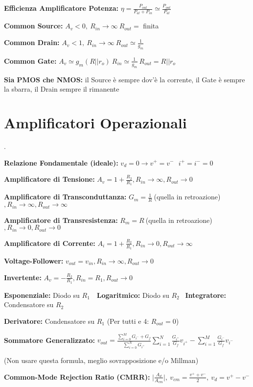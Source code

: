 \documentclass[12pt]{extarticle}
\begin{document}
{\bf Efficienza Amplificatore Potenza:} $\displaystyle \eta = \frac{P_{out}}{P_{al}+P_{in}} \simeq \frac{P_{out}}{P_{al}}$ 

{\bf Common Source:} $ A_v < 0, \ R_{in} \to \infty \ R_{out} = $ finita 

{\bf Common Drain:} $ A_v < 1, \ R_{in} \to \infty \ R_{out} \simeq \frac{1}{g_m}$	

{\bf Common Gate:} $ A_v \simeq g_m(R || r_o) \ R_{in} \simeq \frac{1}{g_m} \ R_{out} = R || r_o$ 

{\bf Sia PMOS che NMOS:} il Source è sempre dov'è la corrente, il Gate è sempre la sbarra, il Drain sempre il rimanente

\section{Amplificatori Operazionali}.

{\bf Relazione Fondamentale (ideale):} $\displaystyle v_d = 0 \to v^+ = v^- \ \ \ i^+ = i^- = 0$

{\bf Amplificatore di Tensione:} $\displaystyle A_v = 1+\frac{R_2}{R_1}, R_{in} \to \infty, R_{out} \to 0$

{\bf Amplificatore di Transconduttanza:} $\displaystyle G_m = \frac{1}{R} \ $(quella in retroazione)$, R_{in} \to \infty, R_{out} \to \infty$

{\bf Amplificatore di Transresistenza: } $\displaystyle R_m = R \ $(quella in retroazione)$, R_{in} \to 0, R_{out} \to 0$

{\bf Amplificatore di Corrente:} $\displaystyle A_i = 1+\frac{R_2}{R_1}, R_{in} \to 0, R_{out} \to \infty$

{\bf Voltage-Follower:} $\displaystyle v_{out} = v_{in}, R_{in} \to \infty, R_{out} \to 0$

{\bf Invertente:} $\displaystyle A_v = -\frac{R_2}{R_1}, R_{in} = R_1, R_{out} \to 0$

{\bf Esponenziale:} Diodo su $R_1$\ \ {\bf Logaritmico:} Diodo su $R_2$ \ {\bf Integratore:} Condensatore su $R_2$

{\bf Derivatore:} Condensatore su $R_1$ (Per tutti e 4: $R_{out} = 0$)


{\bf Sommatore Generalizzato:} $\displaystyle v_{out} = \frac{\sum_{i=0}^M G_{i^-} + G_f}{\sum_{i=0}^N G_{i^+}} \sum_{i=1}^N \frac{G_{i^+}}{G_f}v_{i^+}-\sum_{i=1}^M\frac{G_{i^-}}{G_f}v_{i^-}$ 

(Non usare questa formula, meglio sovrapposizione e/o Millman)

{\bf Common-Mode Rejection Ratio (CMRR):} $\displaystyle \bigg |\frac{A_d}{A_{cm}} \bigg |, \ v_{cm} = \frac{v^++v^-}{2}, \ v_d = v^+-v^-$
\end{document}
